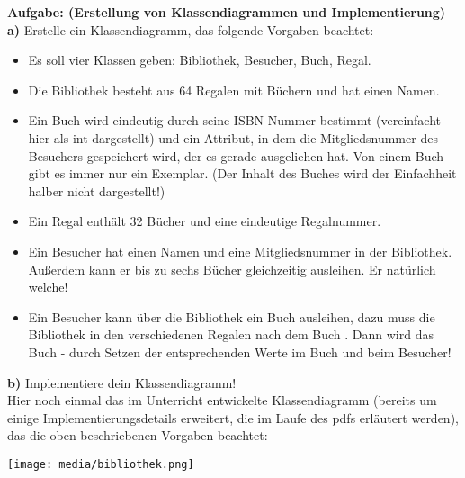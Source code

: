 \documentclass{article}
\begin{document}
\thispagestyle{firstpage}
\setlength{\headsep}{12pt}
\textbf{Aufgabe: (Erstellung von Klassendiagrammen und Implementierung)} \\
\textbf{a)} Erstelle ein Klassendiagramm, das folgende Vorgaben beachtet: 
\begin{itemize}
    \item Es soll vier Klassen geben: Bibliothek, Besucher, Buch, Regal.
    \item Die Bibliothek besteht aus 64 Regalen mit Büchern und hat einen Namen. 
    \item Ein Buch wird eindeutig durch seine ISBN-Nummer bestimmt (vereinfacht hier als int dargestellt) und ein Attribut, in dem die Mitgliedsnummer des Besuchers gespeichert wird, der es gerade ausgeliehen hat. Von einem Buch gibt es immer nur ein Exemplar. (Der Inhalt des Buches wird der Einfachheit halber nicht dargestellt!)
    \item Ein Regal enthält 32 Bücher und eine eindeutige Regalnummer. 
    \item Ein Besucher hat einen Namen und eine Mitgliedsnummer in der Bibliothek. Außerdem kann er bis zu sechs Bücher gleichzeitig ausleihen. Er  natürlich welche!
    \item Ein Besucher kann über die Bibliothek ein Buch ausleihen, dazu muss die Bibliothek in den verschiedenen Regalen nach dem Buch . Dann wird das Buch  - durch Setzen der entsprechenden Werte im Buch und beim Besucher!
\end{itemize} 
\textbf{b)} Implementiere dein Klassendiagramm! \\
Hier noch einmal das im Unterricht entwickelte Klassendiagramm (bereits um einige Implementierungsdetails erweitert, die im Laufe des pdfs erläutert werden), das die oben beschriebenen Vorgaben beachtet:
\begin{center}
    \texttt{[image: media/bibliothek.png]}
\end{center}
\end{document}
